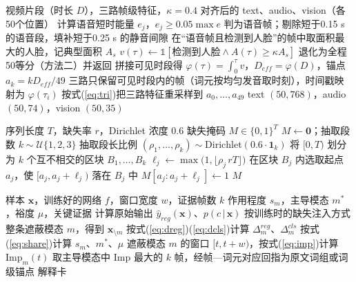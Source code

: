 \begin{algorithm}[H]
\caption{说话者人脸跟踪与有效时段对齐（问题一方法三）}
\label{alg:m3}
\begin{algorithmic}[1]
\Require 视频片段（时长 $D$），三路帧级特征，$\kappa=0.4$
\Ensure 对齐后的 text、audio、vision（各50个位置）
\State 计算语音短时能量 $e_j$，$e_j\ge0.05\max e$ 判为语音帧；剔除短于0.15 s 的语音段，填补短于0.25 s 的静音间隙
\State 在“语音帧且检测到人脸”的帧中取面积最大的人脸，记典型面积 $A_s$
  \State $v(\tau)\gets\mathbb{1}[\text{检测到人脸}\wedge A(\tau)\ge\kappa A_s]$
\EndFor
{} \State 退化为全程50等分（方法二）并返回 \EndIf
\State 拼接可见时段得 $\varphi(\tau)=\int_0^\tau v$，$D_{eff}=\varphi(D)$，锚点 $a_k=kD_{eff}/49$
\State 三路只保留可见时段内的帧（词元按均匀发音取时刻），时间戳映射为 $\varphi(\tau_i)$
\State 按式(\ref{eq:tri})把三路特征重采样到 $a_0,\dots,a_{49}$
\State \Return text $(50,768)$，audio $(50,74)$，vision $(50,35)$
\end{algorithmic}
\end{algorithm}

\begin{algorithm}[H]
\caption{连续段缺失掩码生成（M1）}
\label{alg:m1}
\begin{algorithmic}[1]
\Require 序列长度 $T$，缺失率 $r$，Dirichlet 浓度 $0.6$
\Ensure 缺失掩码 $M\in\{0,1\}^T$
\State $M\gets\mathbf{0}$；抽取段数 $k\sim\mathcal{U}\{1,2,3\}$
\State 抽取段长比例 $(\rho_1,\dots,\rho_k)\sim\mathrm{Dirichlet}(0.6\cdot\mathbf{1}_k)$
\State 将 $[0,T)$ 划分为 $k$ 个互不相交的区块 $B_1,\dots,B_k$
  \State $\ell_j\gets\max\big(1,\lfloor\rho_j\,rT\rfloor\big)$
  \State 在区块 $B_j$ 内选取起点 $a_j$，使 $[a_j,a_j+\ell_j)$ 落在 $B_j$ 中
  \State $M[a_j:a_j+\ell_j]\gets 1$
\EndFor
\State \Return $M$
\end{algorithmic}
\end{algorithm}

\begin{algorithm}[H]
\caption{干预式模态归因与片段扫描（问题三）}
\label{alg:xai}
\begin{algorithmic}[1]
\Require 样本 $\mathbf{x}$，训练好的网络 $f$，窗口宽度 $w$，证据帧数 $k$
\Ensure 作用程度 $s_m$，主导模态 $m^*$，裕度 $\mu$，关键证据
\State 计算原始输出 $\hat y_{reg}(\mathbf{x})$、$p(c\,|\,\mathbf{x})$
  \State 按训练时的缺失注入方式整条遮蔽模态 $m$，得到 $\mathbf{x}_{\setminus m}$
  \State 按式(\ref{eq:dreg})(\ref{eq:dcls})计算 $\Delta_m^{reg}$、$\Delta_m^{cls}$
\EndFor
\State 按式(\ref{eq:share})计算 $s_m$、$m^*$、$\mu$
  \For{有效帧 $t$（文本 $t\in[1,L)$，语音、视觉 $t<L_m$）}
    \State 遮蔽模态 $m$ 的窗口 $[t,t+w)$，按式(\ref{eq:imp})计算 $\mathrm{Imp}_m(t)$
  \EndFor
\EndFor
\State 取主导模态中 $\mathrm{Imp}$ 最大的 $k$ 帧，经帧—词元对应回指为原文词组或词级锚点
\State \Return 解释卡
\end{algorithmic}
\end{algorithm}

